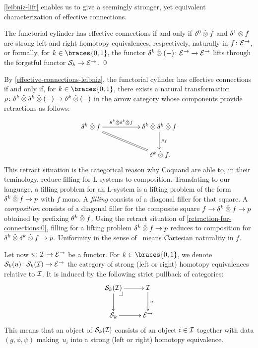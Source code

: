 \documentclass[reqno,10pt,a4paper,oneside,draft]{amsart}
\begin{document}
\cref{leibniz-lift} enables us to give a seemingly stronger, yet equivalent characterization of effective connections.

\begin{corollary} \label{effective-connections-leibniz}
The functorial cylinder has effective connections if and only if $\lcyl \hatotimes f$ and $\rcyl \otimes f$ are strong left and right homotopy equivalences, respectively, naturally in $f \co \catE^\to$, or formally, for $k \in \braces{0, 1}$, the functor $\kcyl \hatotimes (-) \co \catE^\to \to \catE^\to$ lifts through the forgetful functor $\cal{S}_k \to \catE^\to$. \qed
\end{corollary}

\begin{remark} \label{thm:retraction-for-connections}
By \cref{effective-connections-leibniz}, the functorial cylinder has effective connections if and only if, for $k \in \braces{0, 1}$, there exists a natural transformation $\rho \co \kcyl \hatotimes \kcyl \hatotimes (-) \to \kcyl \hatotimes (-)$ in the arrow category whose components provide retractions as follows:
\begin{equation} \label{retraction-for-connections:0}
\xymatrix@C+3em{
  \kcyl \hatotimes f
  \ar[r]^-{\thetak \hatotimes \kcyl \hatotimes f}
  \ar@{=}[dr]
&
  \kcyl \hatotimes \kcyl \hatotimes f
  \ar[d]^{\rho_f}
\\&
  \kcyl \hatotimes f
\rlap{.}}
\end{equation}
This retract situation is the categorical reason why Coquand \etal\cite{coquand-variation} are able to, in their teminology, reduce filling for L-systems to composition.
Translating to our language, a filling problem for an L-system is a lifting problem of the form $\kcyl \hatotimes f \to p$ with $f$ mono.
A \emph{filling} consists of a diagonal filler for that square.
A \emph{composition} consists of a diagonal filler for the composite square $f \to \kcyl \hatotimes f \to p$ obtained by prefixing $\theta^k \hatotimes f$.
Using the retract situation of \eqref{retraction-for-connections:0}, filling for a lifting problem $\kcyl \hatotimes f \to p$ reduces to composition for $\kcyl \hatotimes \kcyl \hatotimes f \to p$.
Uniformity in the sense of~\cite{coquand-variation} means Cartesian naturality in $f$.
\end{remark}

Let now $u \co \cal{I} \to \catE^\to$ be a functor.
For $k \in \braces{0, 1}$, we denote $\cal{S}_k(u) \co \cal{S}_k(\cal{I}) \to \catE^\to$ the category of strong (left or right) homotopy equivalences relative to $\cal{I}$.
It is induced by the following strict pullback of categories:
\[
\xymatrix{
  \cal{S}_k(\cal{I})
  \ar[r]
  \ar[d]
  \pullback{dr}
&
  \cal{I}
  \ar[d]^{u}
\\
  \cal{S}_k
  \ar[r]
&
  \catE^\to
}
\]
This means that an object of $\cal{S}_k(\cal{I})$ consists of an object $i \in \cal{I}$ together with data $(g, \phi, \psi)$ making~$u_i$ into a strong (left or right) homotopy equivalence.
\end{document}
